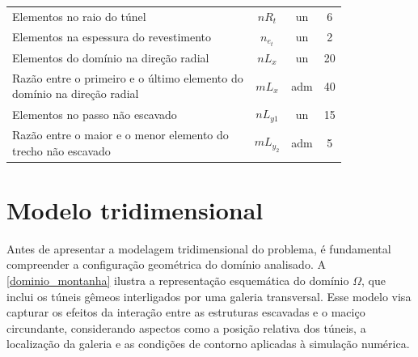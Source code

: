 \begin{table}[H]
\begin{tabular}{l c c c}
		Elementos no raio do túnel & $nR_t$ & un & 6 \\
		Elementos na espessura do revestimento & $n_{e_t}$ & un & 2 \\
		Elementos do domínio na direção radial & $nL_x$ & un & 20 \\
		\makecell[l]{Razão entre o primeiro e o último elemento do \\ domínio na direção radial} & $mL_{x}$ & adm & 40 \\ 
		Elementos no passo não escavado & $nL_{y1}$ & un & 15 \\
		\makecell[l]{Razão entre o maior e o menor elemento do \\ trecho não escavado} & $mL_{y_2}$ & adm & 5 \\ 
		\hline
	\end{tabular}
	\normalsize
\end{table}

\section{Modelo tridimensional}

Antes de apresentar a modelagem tridimensional do problema, é fundamental compreender a configuração geométrica do domínio analisado. A \autoref{dominio_montanha} ilustra a representação esquemática do domínio $\Omega$, que inclui os túneis gêmeos interligados por uma galeria transversal. Esse modelo visa capturar os efeitos da interação entre as estruturas escavadas e o maciço circundante, considerando aspectos como a posição relativa dos túneis, a localização da galeria e as condições de contorno aplicadas à simulação numérica. 

